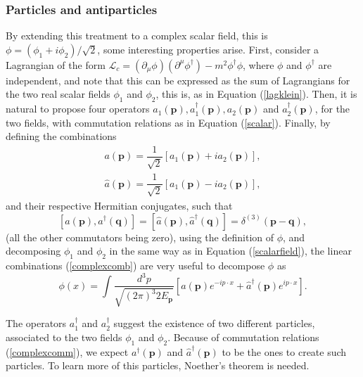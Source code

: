 \subsubsection{Particles and antiparticles} \label{ssec:partandantipart}

By extending this treatment to a complex scalar field, this is $\phi = (\phi_1 + i\phi_2)/\sqrt{2}$, some interesting properties arise. First, consider a Lagrangian of the form $\mathcal{L}_c = (\partial_{\mu}\phi)(\partial^{\mu}\phi^{\dagger}) - m^2\phi^{\dagger}\phi$, where $\phi$ and $\phi^{\dagger}$ are independent, and note that this can be expressed as the sum of Lagrangians for the two real scalar fields $\phi_1$ and $\phi_2$, this is, as in Equation (\ref{lagklein}). Then, it is natural to propose four operators $a_1(\bm{p}), a_1^{\dagger}(\bm{p}), a_2(\bm{p})$ and $a_2^{\dagger}(\bm{p})$, for the two fields, with commutation relations as in Equation (\ref{scalar}). Finally, by defining the combinations
\begin{equation}
\label{complexcomb}
\begin{gathered}
    a(\bm{p}) = \dfrac{1}{\sqrt{2}}[a_1(\bm{p}) + ia_2(\bm{p})], \\
    \hat{a}(\bm{p}) = \dfrac{1}{\sqrt{2}}[a_1(\bm{p}) - ia_2(\bm{p})],
\end{gathered}
\end{equation}
and their respective Hermitian conjugates, such that
\begin{equation}
\label{complexcomm}
    [a(\bm{p}),a^{\dagger}(\bm{q})] = [\hat{a}(\bm{p}),\hat{a}^{\dagger}(\bm{q})] = \delta^{(3)}(\bm{p} - \bm{q}),
\end{equation}
(all the other commutators being zero), using the definition of $\phi$, and decomposing $\phi_1$ and $\phi_2$ in the same way as in Equation (\ref{scalarfield}), the linear combinations (\ref{complexcomb}) are very useful to decompose $\phi$ as
\begin{equation}
    \label{complexfield}
    \phi(x) = \int \dfrac{d^3p}{\sqrt{(2\pi)^{3}2E_{\bm{p}}}} [a(\bm{p})e^{-ip\cdot x} + \hat{a}^{\dagger}(\bm{p})e^{ip\cdot x}].
\end{equation}

The operators $a^{\dagger}_1$ and $a^{\dagger}_2$ suggest the existence of two different particles, associated to the two fields $\phi_1$ and $\phi_2$. Because of commutation relations (\ref{complexcomm}), we expect $a^{\dagger}(\bm{p})$ and $\hat{a}^{\dagger}(\bm{p})$ to be the ones to create such particles. To learn more of this particles, Noether's theorem is needed. 

